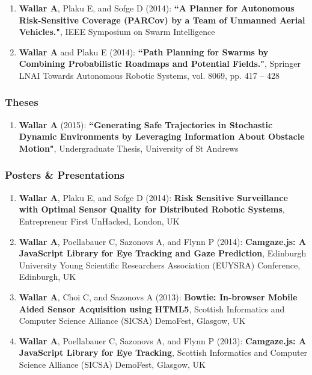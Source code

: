\documentclass[line,margin]{cv}
\begin{document}
\begin{resume}
\begin{enumerate}
    \item \textbf{Wallar A}, Plaku E, and Sofge D (2014): \textbf{``A Planner
        for Autonomous Risk-Sensitive Coverage (PARCov) by a Team of Unmanned
        Aerial Vehicles."}, IEEE Symposium on Swarm Intelligence

    \item \textbf{Wallar A} and Plaku E (2014): \textbf{``Path Planning for
        Swarms by Combining Probabilistic Roadmaps and Potential Fields."},
        Springer LNAI Towards Autonomous Robotic Systems, vol. 8069,
        pp. 417 -- 428

\end{enumerate}

\subsubsection{Theses}

\begin{enumerate}

    \item \textbf{Wallar A} (2015): \textbf{``Generating Safe Trajectories
        in Stochastic Dynamic Environments by Leveraging Information About
        Obstacle Motion"}, Undergraduate Thesis, University of St Andrews

\end{enumerate}


\subsubsection{Posters \& Presentations}

\begin{enumerate}

    \item \textbf{Wallar A}, Plaku E, and Sofge D (2014): \textbf{Risk
        Sensitive Surveillance with Optimal Sensor Quality for Distributed
        Robotic Systems}, Entrepreneur First UnHacked, London, UK

    \item \textbf{Wallar A}, Poellabauer C, Sazonovs A, and Flynn P (2014):
        \textbf{Camgaze.js: A JavaScript Library for Eye Tracking and Gaze
        Prediction}, Edinburgh University Young Scientific Researchers
        Association (EUYSRA) Conference, Edinburgh, UK

    \item \textbf{Wallar A}, Choi C, and Sazonovs A (2013): \textbf{Bowtie:
        In-browser Mobile Aided Sensor Acquisition using HTML5}, Scottish
        Informatics and Computer Science Alliance (SICSA) DemoFest,
        Glasgow, UK

    \item \textbf{Wallar A}, Poellabauer C, Sazonovs A, and Flynn P (2013):
        \textbf{Camgaze.js: A JavaScript Library for Eye Tracking}, Scottish
        Informatics and Computer Science Alliance (SICSA) DemoFest, Glasgow, UK

\end{enumerate}

\end{resume}
\end{document}
